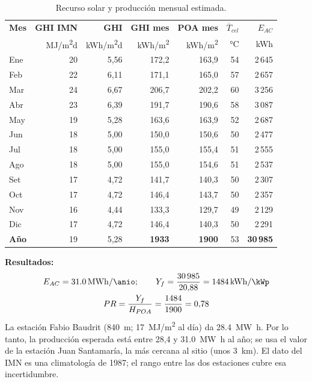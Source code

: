 \documentclass[12pt]{article}
\begin{document}
\begin{table}[H]
\centering\small
\caption{Recurso solar y producción mensual estimada.}\label{tab:energia}
\begin{tabular}{lrrrrrr}
\toprule
\textbf{Mes} & \textbf{GHI IMN} & \textbf{GHI} & \textbf{GHI mes} & \textbf{POA mes} & $\overline{T}_{cel}$ & $E_{AC}$\\
 & MJ/m\textsuperscript{2}d & kWh/m\textsuperscript{2}d & kWh/m\textsuperscript{2} & kWh/m\textsuperscript{2} & °C & kWh\\
\midrule
Ene & 20 & 5,56 & 172,2 & 163,9 & 54 & 2\,645 \\
Feb & 22 & 6,11 & 171,1 & 165,0 & 57 & 2\,657 \\
Mar & 24 & 6,67 & 206,7 & 202,2 & 60 & 3\,256 \\
Abr & 23 & 6,39 & 191,7 & 190,6 & 58 & 3\,087 \\
May & 19 & 5,28 & 163,6 & 163,9 & 52 & 2\,687 \\
Jun & 18 & 5,00 & 150,0 & 150,6 & 50 & 2\,477 \\
Jul & 18 & 5,00 & 155,0 & 155,4 & 51 & 2\,555 \\
Ago & 18 & 5,00 & 155,0 & 154,6 & 51 & 2\,537 \\
Set & 17 & 4,72 & 141,7 & 140,3 & 50 & 2\,307 \\
Oct & 17 & 4,72 & 146,4 & 143,7 & 50 & 2\,357 \\
Nov & 16 & 4,44 & 133,3 & 129,7 & 49 & 2\,129 \\
Dic & 17 & 4,72 & 146,4 & 140,3 & 50 & 2\,291 \\
\midrule
\textbf{Año} & 19 & 5,28 & \textbf{1933} & \textbf{1900} & 53 & \textbf{30\,985}\\
\bottomrule
\end{tabular}
\end{table}

\textbf{Resultados:}
\begin{gather}
E_{AC}=\SI{31.0}{\mega\watt\hour\per\anio};\qquad Y_f=\frac{30\,985}{20{,}88}=\SI{1484}{\kilo\watt\hour\per\kWp}\\
PR=\frac{Y_f}{H_{POA}}=\frac{1484}{1900}=0{,}78
\end{gather}
La estación Fabio Baudrit (840~m; 17~MJ/m\textsuperscript{2} al día) da \SI{28.4}{\mega\watt\hour}. Por lo tanto, la producción esperada está entre 28,4 y \SI{31.0}{\mega\watt\hour} al año; se usa el valor de la estación Juan Santamaría, la más cercana al sitio (unos 3~km). El dato del IMN es una climatología de 1987; el rango entre las dos estaciones cubre esa incertidumbre.
\end{document}
